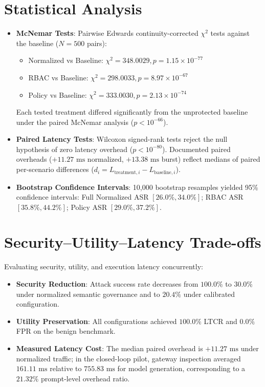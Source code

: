 \documentclass[10pt,twocolumn,letterpaper]{article}
\begin{document}
\section{Statistical Analysis}
\begin{itemize}
    \item \textbf{McNemar Tests}: Pairwise Edwards continuity-corrected $\chi^2$ tests against the baseline ($N=500$ pairs):
    \begin{itemize}
        \item Normalized vs Baseline: $\chi^2 = 348.0029, p = 1.15 \times 10^{-77}$
        \item RBAC vs Baseline: $\chi^2 = 298.0033, p = 8.97 \times 10^{-67}$
        \item Policy vs Baseline: $\chi^2 = 333.0030, p = 2.13 \times 10^{-74}$
    \end{itemize}
    Each tested treatment differed significantly from the unprotected baseline under the paired McNemar analysis ($p < 10^{-66}$).
    \item \textbf{Paired Latency Tests}: Wilcoxon signed-rank tests reject the null hypothesis of zero latency overhead ($p < 10^{-80}$). Documented paired overheads ($+11.27\text{ ms}$ normalized, $+13.38\text{ ms}$ burst) reflect medians of paired per-scenario differences ($d_i = L_{\text{treatment}, i} - L_{\text{baseline}, i}$).
    \item \textbf{Bootstrap Confidence Intervals}: 10,000 bootstrap resamples yielded 95\% confidence intervals: Full Normalized ASR $[26.0\%, 34.0\%]$; RBAC ASR $[35.8\%, 44.2\%]$; Policy ASR $[29.0\%, 37.2\%]$.
\end{itemize}

\section{Security--Utility--Latency Trade-offs}
Evaluating security, utility, and execution latency concurrently:
\begin{itemize}
    \item \textbf{Security Reduction}: Attack success rate decreases from $100.0\%$ to $30.0\%$ under normalized semantic governance and to $20.4\%$ under calibrated configuration.
    \item \textbf{Utility Preservation}: All configurations achieved $100.0\%$ LTCR and $0.0\%$ FPR on the benign benchmark.
    \item \textbf{Measured Latency Cost}: The median paired overhead is $+11.27\text{ ms}$ under normalized traffic; in the closed-loop pilot, gateway inspection averaged $161.11\text{ ms}$ relative to $755.83\text{ ms}$ for model generation, corresponding to a $21.32\%$ prompt-level overhead ratio.
\end{itemize}
\end{document}
